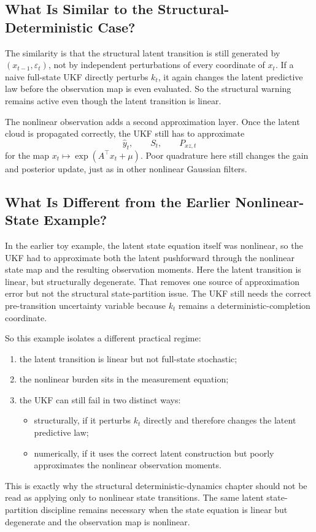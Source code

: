 \subsection{What Is Similar to the Structural-Deterministic Case?}
\label{sec:bf-exp-affine-similarities}

The similarity is that the structural latent transition is still generated by
$(x_{t-1},\varepsilon_t)$, not by independent perturbations of every coordinate
of $x_t$.  If a naive full-state UKF directly perturbs $k_t$, it again changes
the latent predictive law before the observation map is even evaluated.  So the
structural warning remains active even though the latent transition is linear.

The nonlinear observation adds a second approximation layer.  Once the latent
cloud is propagated correctly, the UKF still has to approximate
\[
  \hat y_t,
  \qquad
  S_t,
  \qquad
  P_{xz,t}
\]
for the map $x_t \mapsto \exp(A^\top x_t + \mu)$.  Poor quadrature here still
changes the gain and posterior update, just as in other nonlinear Gaussian
filters.

\subsection{What Is Different from the Earlier Nonlinear-State Example?}
\label{sec:bf-exp-affine-differences}

In the earlier toy example, the latent state equation itself was nonlinear, so
the UKF had to approximate both the latent pushforward through the nonlinear
state map and the resulting observation moments.  Here the latent transition is
linear, but structurally degenerate.  That removes one source of approximation
error but not the structural state-partition issue.  The UKF still needs the
correct pre-transition uncertainty variable because $k_t$ remains a
deterministic-completion coordinate.

So this example isolates a different practical regime:
\begin{enumerate}[label=(\roman*)]
  \item the latent transition is linear but not full-state stochastic;
  \item the nonlinear burden sits in the measurement equation;
  \item the UKF can still fail in two distinct ways:
    \begin{itemize}
      \item structurally, if it perturbs $k_t$ directly and therefore changes the
        latent predictive law;
      \item numerically, if it uses the correct latent construction but poorly
        approximates the nonlinear observation moments.
    \end{itemize}
\end{enumerate}
This is exactly why the structural deterministic-dynamics chapter should not be
read as applying only to nonlinear state transitions.  The same latent
state-partition discipline remains necessary when the state equation is linear
but degenerate and the observation map is nonlinear.

